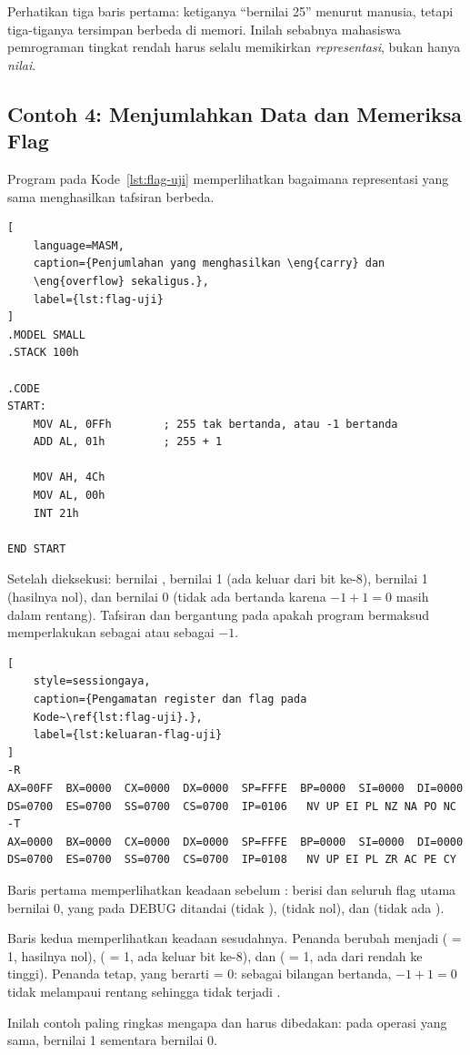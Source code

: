 \begin{infobox}
Perhatikan tiga baris pertama: ketiganya ``bernilai 25'' menurut
manusia, tetapi tiga-tiganya tersimpan berbeda di memori. Inilah
sebabnya mahasiswa pemrograman tingkat rendah harus selalu
memikirkan \emph{representasi}, bukan hanya \emph{nilai}.
\end{infobox}

\subsection{Contoh 4: Menjumlahkan Data dan Memeriksa Flag}

Program pada Kode~\ref{lst:flag-uji} memperlihatkan bagaimana
representasi yang sama menghasilkan tafsiran berbeda.

\begin{lstlisting}[
    language=MASM,
    caption={Penjumlahan yang menghasilkan \eng{carry} dan
    \eng{overflow} sekaligus.},
    label={lst:flag-uji}
]
.MODEL SMALL
.STACK 100h

.CODE
START:
    MOV AL, 0FFh        ; 255 tak bertanda, atau -1 bertanda
    ADD AL, 01h         ; 255 + 1

    MOV AH, 4Ch
    MOV AL, 00h
    INT 21h

END START
\end{lstlisting}

Setelah  dieksekusi:  bernilai ,
 bernilai 1 (ada  keluar dari bit ke-8),
 bernilai 1 (hasilnya nol), dan  bernilai 0
(tidak ada  bertanda karena $-1 + 1 = 0$ masih dalam
rentang). Tafsiran  dan  bergantung pada
apakah program bermaksud memperlakukan  sebagai
 atau sebagai $-1$.

\begin{lstlisting}[
    style=sessiongaya,
    caption={Pengamatan register dan flag pada
    Kode~\ref{lst:flag-uji}.},
    label={lst:keluaran-flag-uji}
]
-R
AX=00FF  BX=0000  CX=0000  DX=0000  SP=FFFE  BP=0000  SI=0000  DI=0000
DS=0700  ES=0700  SS=0700  CS=0700  IP=0106   NV UP EI PL NZ NA PO NC
-T
AX=0000  BX=0000  CX=0000  DX=0000  SP=FFFE  BP=0000  SI=0000  DI=0000
DS=0700  ES=0700  SS=0700  CS=0700  IP=0108   NV UP EI PL ZR AC PE CY
\end{lstlisting}

Baris pertama memperlihatkan keadaan sebelum :
 berisi  dan seluruh flag utama bernilai 0, yang pada
DEBUG ditandai  (tidak ),  (tidak
nol), dan  (tidak ada ).

Baris kedua memperlihatkan keadaan sesudahnya. Penanda berubah
menjadi  ( = 1, hasilnya nol), 
( = 1, ada  keluar bit ke-8), dan 
( = 1, ada  dari  rendah ke tinggi).
Penanda  tetap, yang berarti  = 0: sebagai
bilangan bertanda, $-1 + 1 = 0$ tidak melampaui rentang sehingga
tidak terjadi .

Inilah contoh paling ringkas mengapa  dan
 harus dibedakan: pada operasi yang sama,
 bernilai 1 sementara  bernilai 0.
